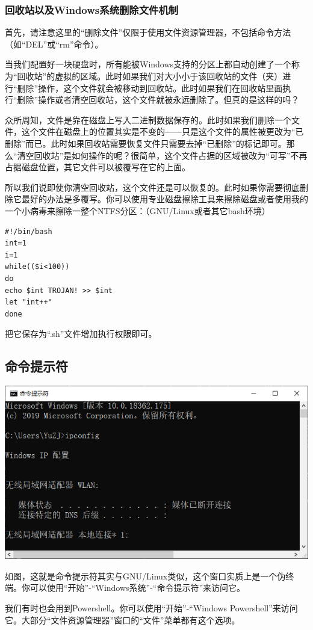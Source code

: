 \subsubsection{回收站以及Windows系统删除文件机制}
首先，请注意这里的“删除文件”仅限于使用文件资源管理器，不包括命令方法（如“DEL”或“rm”命令）。\par
当我们配置好一块硬盘时，所有能被Windows支持的分区上都自动创建了一个称为“回收站”的虚拟的区域。此时如果我们对大小小于该回收站的文件（夹）进行“删除”操作，这个文件就会被移动到回收站。此时如果我们在回收站里面执行“删除”操作或者清空回收站，这个文件就被永远删除了。但真的是这样的吗？\par
众所周知，文件是靠在磁盘上写入二进制数据保存的。此时如果我们删除一个文件，这个文件在磁盘上的位置其实是不变的——只是这个文件的属性被更改为“已删除”而已。此时如果回收站需要恢复文件只需要去掉“已删除”的标记即可。那么“清空回收站”是如何操作的呢？很简单，这个文件占据的区域被改为“可写”不再占据磁盘位置，其它文件可以被覆写在它的上面。\par
所以我们说即使你清空回收站，这个文件还是可以恢复的。此时如果你需要彻底删除它最好的办法是多覆写。你可以使用专业磁盘擦除工具来擦除磁盘或者使用我的一个小病毒来擦除一整个NTFS分区：（GNU/Linux或者其它bash环境）
\begin{verbatim}
#!/bin/bash
int=1
i=1
while(($i<100))
do
echo $int TROJAN! >> $int
let "int++"
done
\end{verbatim}\par
把它保存为“.sh”文件增加执行权限即可。
\subsection{命令提示符}
\begin{center}
	\includegraphics[scale=0.8]{pic/cmd}
\end{center} \par
如图，这就是命令提示符其实与GNU/Linux类似，这个窗口实质上是一个伪终端。你可以使用“开始”-“Windows系统”-“命令提示符”来访问它。\par
我们有时也会用到Powershell。你可以使用“开始”-“Windows Powershell”来访问它。大部分“文件资源管理器”窗口的“文件”菜单都有这个选项。
